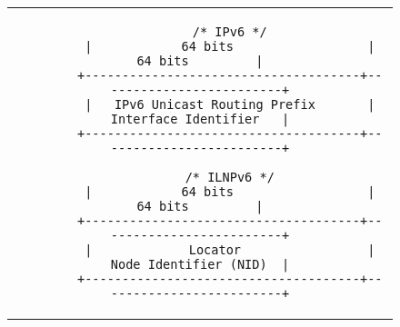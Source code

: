 \documentclass{article}
\begin{document}
\begin{figure}[ht]
	\begin{tabular}{c}
	\begin{lstlisting}
		/* IPv6 */
		|            64 bits                  |         64 bits         |
		+-------------------------------------+-------------------------+
		|   IPv6 Unicast Routing Prefix       |  Interface Identifier   |
		+-------------------------------------+-------------------------+

		/* ILNPv6 */
		|            64 bits                  |         64 bits         |
		+-------------------------------------+-------------------------+
		|             Locator                 |  Node Identifier (NID)  |
		+-------------------------------------+-------------------------+
	\end{lstlisting}
	\end{tabular}
\end{figure}
\end{document}
